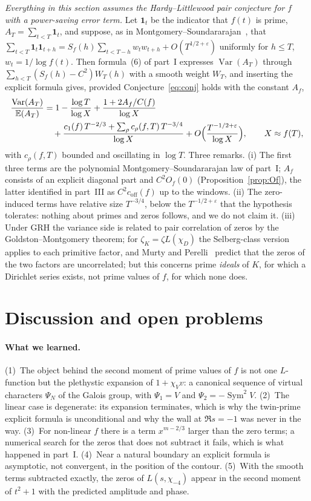 \documentclass[11pt,a4paper]{article}
\theoremstyle{remark}\newtheorem{remark}[theorem]{Remark}
\providecommand{\Var}{\operatorname{Var}}\providecommand{\E}{\mathbb{E}}
\newcommand{\Sym}{\operatorname{Sym}}\newcommand{\Res}{\operatorname*{Res}}
\begin{document}
\emph{Everything in this section assumes the Hardy--Littlewood pair conjecture for $f$ with a power-saving
error term.} Let $\mathbf 1_t$ be the indicator that $f(t)$ is prime, $A_T=\sum_{t<T}\mathbf 1_t$, and suppose,
as in Montgomery--Soundararajan~\cite{MontgomerySoundararajan2004}, that
$\sum_{t<T}\mathbf 1_t\mathbf 1_{t+h}=S_f(h)\sum_{t<T-h}w_tw_{t+h}+O(T^{1/2+\varepsilon})$ uniformly for $h\le T$,
$w_t=1/\log f(t)$. Then formula~(6) of part~I expresses $\Var(A_T)$ through $\sum_{h<T}(S_f(h)-C^2)W_T(h)$ with a
smooth weight $W_T$, and inserting the explicit formula gives, provided Conjecture~\eqref{eq:conj} holds with
the constant $A_f$,
\[
\begin{aligned}
\frac{\Var(A_T)}{\E(A_T)}&=1-\frac{\log T}{\log X}+\frac{1+2A_f/C(f)}{\log X}\\
&\quad+\frac{c_1(f)\,T^{-2/3}+\sum_\rho c_\rho(f,T)\,T^{-3/4}}{\log X}+O\Bigl(\frac{T^{-1/2+\varepsilon}}{\log X}\Bigr),\qquad X\approx f(T),
\end{aligned}
\]
with $c_\rho(f,T)$ bounded and oscillating in $\log T$. Three remarks. (i) The first three terms are the
polynomial Montgomery--Soundararajan law of part~I; $A_f$ consists of an explicit diagonal part and
$C^2O_f(0)$ (Proposition~\ref{prop:Of}), the latter identified in part~III as $C^2c_{\mathrm{off}}(f)$ up to the windows. (ii) The zero-induced terms have relative size $T^{-3/4}$, below the
$T^{-1/2+\varepsilon}$ that the hypothesis tolerates: nothing about primes and zeros follows, and we do not
claim it. (iii) Under GRH the variance side is related to pair correlation of zeros by the
Goldston--Montgomery theorem; for $\zeta_K=\zeta L(\chi_D)$ the Selberg-class version~\cite{BuiKeatingSmith2016}
applies to each primitive factor, and Murty and Perelli~\cite{MurtyPerelli1999} predict that the zeros of the
two factors are uncorrelated; but this concerns prime \emph{ideals} of $K$, for which a Dirichlet series
exists, not prime values of $f$, for which none does.

\section{Discussion and open problems}\label{sec:disc}

\paragraph{What we learned.} (1)~The object behind the second moment of prime values of $f$ is not one
$L$-function but the plethystic expansion of $1+\chi_Vv$: a canonical sequence of virtual characters $\Psi_N$
of the Galois group, with $\Psi_1=V$ and $\Psi_2=-\Sym^2V$. (2)~The linear case is degenerate: its expansion
terminates, which is why the twin-prime explicit formula is unconditional and why the wall at $\Re s=-1$ was
never in the way. (3)~For non-linear $f$ there is a term $x^{m-2/3}$ larger than the zero terms; a numerical
search for the zeros that does not subtract it fails, which is what happened in part~I. (4)~Near a natural
boundary an explicit formula is asymptotic, not convergent, in the position of the contour. (5)~With the
smooth terms subtracted exactly, the zeros of $L(s,\chi_{-4})$ appear in the second moment of $t^2+1$ with the
predicted amplitude and phase.
\end{document}
